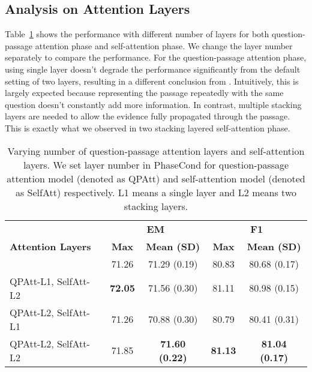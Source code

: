 \documentclass{article} \usepackage{arxiv, times}
\begin{document}
\subsection{Analysis on Attention Layers}
Table~\ref{tab:layers} shows the performance with different number of layers for both question-passage attention phase and self-attention phase. 
We change the layer number separately to compare the performance. For the question-passage attention phase, using single layer doesn't degrade the performance significantly from the default setting of two layers, resulting in a different conclusion from \cite{hureinforced, xiong2016dynamic}. Intuitively, this is largely expected because representing the passage repeatedly with the same question doesn't constantly add more information. In contrast, multiple stacking layers are needed to allow the evidence fully propagated through the passage. This is exactly what we observed in two stacking layered self-attention phase. 



\begin{table}[t] 
\caption{Varying number of question-passage attention layers and self-attention layers. We set layer number in PhaseCond for question-passage attention model (denoted as QPAtt) and self-attention model (denoted as SelfAtt) respectively. L1 means a single layer and L2 means two stacking layers.}\label{tab:layers} 
 \begin{center}
 \begin{tabular}{lcccc}
 \hline
\multirow{3}{*}{\bf Attention Layers}& \multicolumn{2}{c}{\bf EM} & \multicolumn{2}{c}{\bf F1}\\
 & \bf Max & \bf Mean (SD) & \bf Max & \bf Mean (SD) \\
 \hline
 QPAtt-L1, SelfAtt-L1 & 71.26 & 71.29 (0.19)&80.83 & 80.68 (0.17)\\
 QPAtt-L1, SelfAtt-L2 & \bf 72.05 &71.56 (0.30)&81.11 & 80.98 (0.15)\\
 QPAtt-L2, SelfAtt-L1 & 71.26  & 70.88 (0.30)& 80.79 & 80.41 (0.31)\\
 QPAtt-L2, SelfAtt-L2 & 71.85 & \bf 71.60 (0.22) & \bf 81.13 & \bf 81.04 (0.17)  \\
\hline
 \end{tabular}
 \end{center}
 \end{table}
\end{document}
